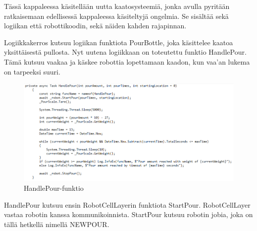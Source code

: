 Tässä kappaleessa käsitellään uutta kaatosysteemiä, jonka avulla pyritään ratkaisemaan edellisessä kappaleessa käsiteltyjä ongelmia. Se sisältää sekä logiikan että robottikoodin, sekä näiden kahden rajapinnan.


Logiikkakerros kutsuu logiikan funktiota PourBottle, joka käsittelee kaatoa yksittäisestä pullosta. Nyt uutena logiikkaan on toteutettu funktio HandlePour. Tämä kutsuu vaakaa ja käskee robottia lopettamaan kaadon, kun vaa'an lukema on tarpeeksi suuri.

\begin{figure}[h]
\begin{center}
\includegraphics[scale=0.6]{img/HandlePour.png}
\end{center}
\caption{HandlePour-funktio}
\label{fig:HandlePour}
\end{figure}

HandlePour kutsuu ensin RobotCellLayerin funktiota StartPour. RobotCellLayer vastaa robotin kanssa kommunikoinnista. StartPour kutsuu robotin jobia, joka on tällä hetkellä nimellä NEWPOUR.

